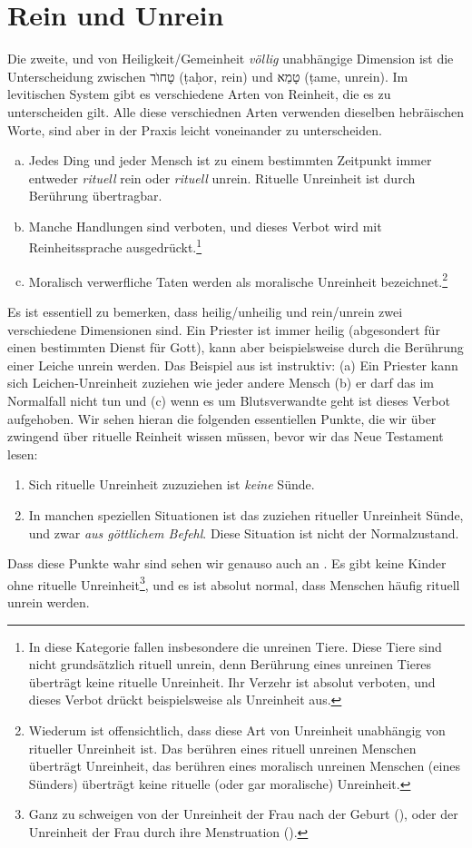 \section{\label{opfer-als-nicht-tod}Rein und Unrein}
Die zweite, und von Heiligkeit/Gemeinheit \textit{völlig} unabhängige Dimension ist die Unterscheidung zwischen טָחוֺר (ṭaḥor, rein) und טָמֵא (ṭame, unrein).
Im levitischen System gibt es verschiedene Arten von Reinheit, die es zu unterscheiden gilt.
Alle diese verschiednen Arten verwenden dieselben hebräischen Worte, sind aber in der Praxis leicht voneinander zu unterscheiden.
\begin{enumerate}[(a)]
	\item Jedes Ding und jeder Mensch ist zu einem bestimmten Zeitpunkt immer entweder \textit{rituell} rein oder \textit{rituell} unrein.
	Rituelle Unreinheit ist durch Berührung übertragbar.
	\item Manche Handlungen sind verboten, und dieses Verbot wird mit Reinheitssprache ausgedrückt.\footnote{
		In diese Kategorie fallen insbesondere die unreinen Tiere. Diese Tiere sind nicht grundsätzlich rituell unrein, denn Berührung eines unreinen Tieres überträgt keine rituelle Unreinheit. Ihr Verzehr ist absolut verboten, und dieses Verbot drückt beispielsweise  als Unreinheit aus.}
	\item Moralisch verwerfliche Taten werden als moralische Unreinheit bezeichnet.\footnote{
		Wiederum ist offensichtlich, dass diese Art von Unreinheit unabhängig von ritueller Unreinheit ist. Das berühren eines rituell unreinen Menschen überträgt Unreinheit, das berühren eines moralisch unreinen Menschen (eines Sünders) überträgt keine rituelle (oder gar moralische) Unreinheit.}
\end{enumerate}
Es ist essentiell zu bemerken, dass heilig/unheilig und rein/unrein zwei verschiedene Dimensionen sind.
Ein Priester ist immer heilig (abgesondert für einen bestimmten Dienst für Gott), kann aber beispielsweise durch die Berührung einer Leiche unrein werden.
Das Beispiel aus  ist instruktiv:
(a) Ein Priester kann sich Leichen-Unreinheit zuziehen wie jeder andere Mensch (b) er darf das im Normalfall nicht tun und (c) wenn es um Blutsverwandte geht ist dieses Verbot aufgehoben.
Wir sehen hieran die folgenden essentiellen Punkte, die wir über zwingend über rituelle Reinheit wissen müssen, bevor wir das Neue Testament lesen:
\begin{enumerate}[(1)]
	\item Sich rituelle Unreinheit zuzuziehen ist \textit{keine} Sünde.
	\item In manchen speziellen Situationen ist das zuziehen ritueller Unreinheit Sünde, und zwar \textit{aus göttlichem Befehl}. Diese Situation ist nicht der Normalzustand.
\end{enumerate}
Dass diese Punkte wahr sind sehen wir genauso auch an .
Es gibt keine Kinder ohne rituelle Unreinheit\footnote{Ganz zu schweigen von der Unreinheit der Frau nach der Geburt (), oder der Unreinheit der Frau durch ihre Menstruation ().},
und es ist absolut normal, dass Menschen häufig rituell unrein werden.

